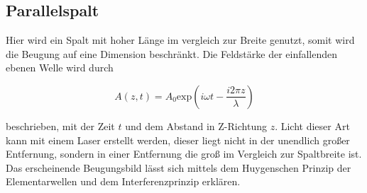     \subsection{Parallelspalt}

        \noindent Hier wird ein Spalt mit hoher Länge im vergleich zur Breite genutzt, somit wird die Beugung auf eine Dimension beschränkt.
        Die Feldstärke der einfallenden ebenen Welle wird durch 

        \begin{equation*}
            A(z,t) = A_0 \text{exp}\left(i \omega t - \frac{i 2\pi z}{\lambda}\right)
        \end{equation*}

        \noindent beschrieben, mit der Zeit $t$ und dem Abstand in Z-Richtung $z$. Licht dieser Art kann mit einem Laser erstellt werden, 
        dieser liegt nicht in der unendlich großer Entfernung, sondern in einer Entfernung die groß im Vergleich zur Spaltbreite ist. 
        Das erscheinende Beugungsbild lässt sich mittels dem Huygenschen Prinzip der Elementarwellen und dem Interferenzprinzip 
        erklären. 
        
        
        
    

